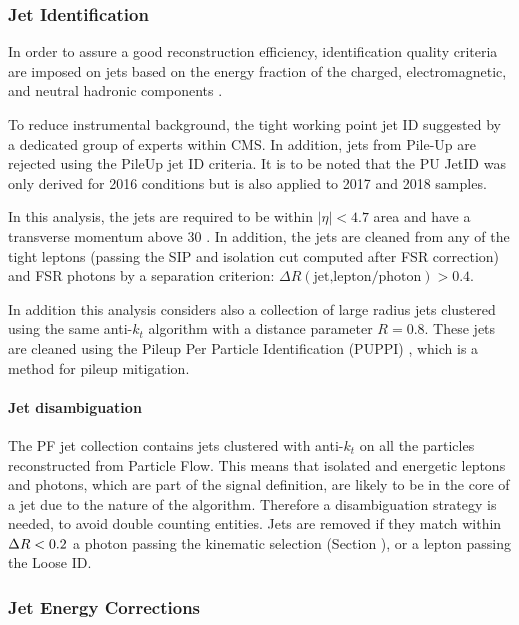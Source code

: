 \subsubsection{Jet Identification}

In order to assure a good reconstruction efficiency, identification quality criteria are imposed on jets based on
the energy fraction of the charged, electromagnetic, and neutral hadronic components \cite{CMS-PAS-JME-16-003}.

To reduce instrumental background, the tight working point jet ID suggested by
a dedicated group of experts within CMS.
In addition, jets from Pile-Up are rejected using the PileUp jet ID criteria.%
It is to be noted that the PU JetID was only derived for 2016 conditions but is also applied to 2017 and 2018 samples. 

In this analysis, the jets are required to be within $|\eta| < 4.7$ area and have a transverse momentum above 30 \GeV. 
In addition, the jets are cleaned from any of the tight leptons (passing the SIP and isolation cut computed after FSR correction) 
and FSR photons by a separation criterion: $\Delta R(\text{jet,lepton/photon}) > 0.4$.

In addition this analysis considers also a collection of large radius jets clustered using the same anti-$k_t$ algorithm with a distance parameter $R = 0.8$.
These jets are cleaned using the Pileup Per Particle Identification (PUPPI) \cite{Bertolini_2014}, which is a method for pileup mitigation.

\paragraph{Jet disambiguation\\}
The PF jet collection contains jets clustered with anti-$k_t$ on all the particles reconstructed from Particle Flow.
This means that isolated and energetic leptons and photons, which are part of the signal definition,
are likely to be in the core of a jet due to the nature of the algorithm.
Therefore a disambiguation strategy is needed, to avoid double counting entities.
Jets are removed if they match within $\Delta R < 0.2$ a photon passing the kinematic selection (Section ),
or a lepton passing the Loose ID.

\subsubsection{Jet Energy Corrections}

